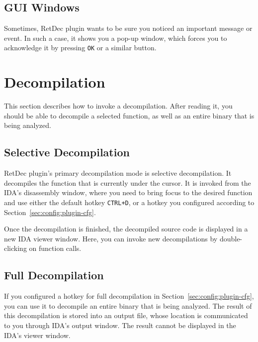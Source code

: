 \documentclass[pdftex, a4paper,12pt, oneside, svgnames]{article}
\begin{document}
\subsection{GUI Windows}
Sometimes, RetDec plugin wants to be sure you noticed an important message or event. In such a case, it shows you a pop-up window, which forces you to acknowledge it by pressing \texttt{OK} or a similar button.

\section{Decompilation}
\label{sec:decompilation}
This section describes how to invoke a decompilation. After reading it, you should be able to decompile a selected function, as well as an entire binary that is being analyzed.

\subsection{Selective Decompilation}
\label{sec:selective-decompilation}
RetDec plugin's primary decompilation mode is selective decompilation. It decompiles the function that is currently under the cursor. It is invoked from the IDA's disassembly window, where you need to bring focus to the desired function and use either the default hotkey \texttt{CTRL+D}, or a hotkey you configured according to Section~\ref{sec:config:plugin-cfg}.

Once the decompilation is finished, the decompiled source code is displayed in a new IDA viewer window. Here, you can invoke new decompilations by double-clicking on function calls.

\subsection{Full Decompilation}
If you configured a hotkey for full decompilation in Section~\ref{sec:config:plugin-cfg}, you can use it to decompile an entire binary that is being analyzed. The result of this decompilation is stored into an output file, whose location is communicated to you through IDA's output window. The result cannot be displayed in the IDA's viewer window.

\end{document}
